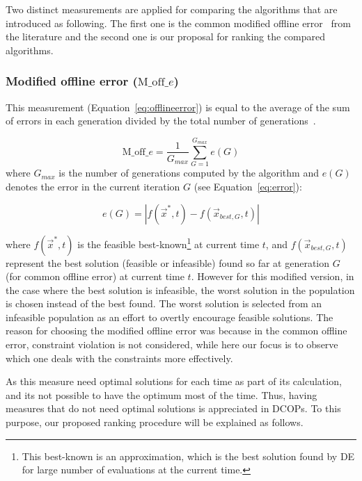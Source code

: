 \documentclass[conference]{IEEEtran}
\begin{document}
Two distinct measurements are applied for comparing the algorithms that are introduced as following. The first one is the common modified offline error~\cite{nguyen2012continuous} from the literature and the second one is our proposal for ranking the compared algorithms.

\subsubsection{Modified offline error ($\text{M\_off}\_e$)}
This measurement (Equation~\ref{eq:offlineerror}) is equal to the average of the sum of errors in each generation divided by the total number of generations~\cite{nguyen2012continuous}.

\begin{equation}
\text{M\_off}\_e= \frac{1}{G_{max}} \sum_{G = 1}^{G_{max}} e(G)
\label{eq:offlineerror}
\end{equation}
\noindent where $G_{max}$ is the number of generations computed by the algorithm and $e(G)$ denotes the error 
in the current iteration $G$ (see Equation~\ref{eq:error}):

\begin{equation}
	e(G)= |f(\vec{x}^*,t) - f(\vec{x}_{best,G},t)|
	\label{eq:error}
\end{equation}

\noindent where $f(\vec{x}^*,t)$ is the feasible best-known\footnote{This best-known is an approximation, which is the best solution found by DE for large number of evaluations at the current time.} at current time $t$, and $f(\vec{x}_{best,G},t)$ represent the best solution (feasible or infeasible) found so far at generation $G$  (for common offline error) at current time $t$. However for this modified version, in the case where the best solution is infeasible, the worst solution in the population is chosen instead of the best found. The worst solution is selected from an infeasible population as an effort to overtly encourage feasible solutions. The reason for choosing the modified offline error was because in the common offline error, constraint violation is not considered, while here our focus is to observe which one deals with the constraints more effectively.  

As this measure need optimal solutions for each time as part of its calculation, and its not possible to have the optimum most of the time. Thus, having measures that do not need optimal solutions is appreciated in DCOPs. To this purpose, our proposed ranking procedure will be explained as follows.
\end{document}
